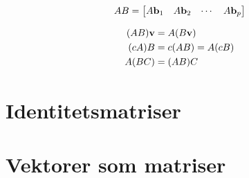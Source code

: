 \[
AB =
\begin{bmatrix}
A \mathbf{b}_1 & A \mathbf{b}_2 & \cdots & A \mathbf{b}_p
\end{bmatrix}
\]



\begin{thm}
\begin{align*}
(AB) \mathbf{v} &= A (B \mathbf{v}) \\
(c A) B &= c (AB) = A (cB) \\
A(BC) &= (AB)C
\end{align*}
\end{thm}


\section*{Identitetsmatriser}


\section*{Vektorer som matriser}


\kapittelslutt
